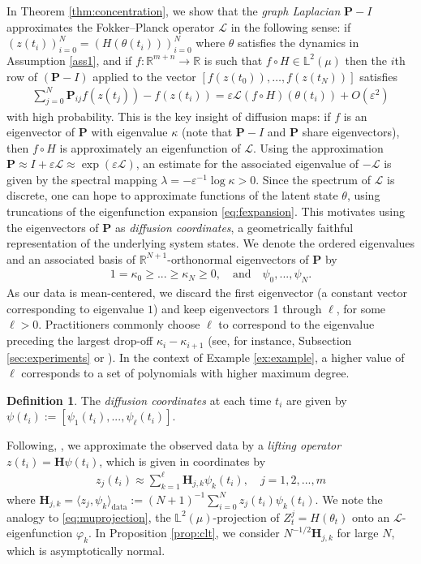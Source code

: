 \documentclass[11pt]{article}
\theoremstyle{plain}
\theoremstyle{definition}
\newtheorem{definition}[theorem]{Definition}
\theoremstyle{remark}
\numberwithin{equation}{section}
\newcommand{\R}{\mathbb{R}}
\renewcommand{\L}{\mathscr{L}}
\newcommand{\veps}{\varepsilon}
\newcommand{\bL}{\mathbb{L}}
\begin{document}
In Theorem \ref{thm:concentration}, we show that the \emph{graph Laplacian} $\mathbf{P}-I$ approximates the Fokker--Planck operator $\L$ in the following sense: if $(z(t_i))_{i=0}^{N}=(H(\theta(t_i)))_{i=0}^{N}$ where $\theta$ satisfies the dynamics in Assumption \ref{ass1}, and if $f:\R^{m+n}\to \R$ is such that $f\circ H\in \bL^2(\mu)$ then the $i$th row of $(\mathbf{P}-I)$ applied to the vector $[f(z(t_0)),\dots,f(z(t_N))]$ satisfies
\begin{align*}
\sum_{j=0}^N\mathbf{P}_{ij} f(z(t_j))-f(z(t_i))=\veps \L (f\circ H)(\theta(t_i))+O(\veps^2)
\end{align*}
with high probability. This is the key insight of diffusion maps: if $f$ is an eigenvector of $\mathbf{P}$ with eigenvalue $\kappa$ (note that $\mathbf{P}-I$ and $\mathbf{P}$ share eigenvectors), then $f\circ H$ is approximately an eigenfunction of $\L$. Using the approximation $\mathbf{P}\approx I+\veps \L\approx \exp(\veps \L)$, an estimate for the associated eigenvalue of $-\L$ is given by the spectral mapping $\lambda=-\veps^{-1}\log \kappa>0$. Since the spectrum of $\L$ is discrete, one can hope to approximate functions of the latent state $\theta$, using truncations of the eigenfunction expansion \eqref{eq:fexpansion}. This motivates using the eigenvectors of $\mathbf{P}$ as \emph{diffusion coordinates}, a geometrically faithful representation of the underlying system states.
We denote the ordered eigenvalues and an associated basis of $\R^{N+1}$-orthonormal eigenvectors of $\mathbf{P}$ by
\begin{align*}
1=\kappa_0\geq ... \geq \kappa_{N} \geq 0,\quad \text{and}\quad \psi_0,...,\psi_{N}.
\end{align*}
As our data is mean-centered, we discard the first eigenvector (a constant vector corresponding to eigenvalue $1$) and keep eigenvectors 1 through $\ell$, for some $\ell>0$. Practitioners commonly choose $\ell$ to correspond to the eigenvalue preceding the largest drop-off $\kappa_{i}-\kappa_{i+1}$ (see, for instance, Subsection \ref{sec:experiments} or \citet[Subsection 3.2]{coifman2008diffusion}). In the context of Example \ref{ex:example}, a higher value of $\ell$ corresponds to a set of polynomials with higher maximum degree.

\begin{definition}
The \emph{diffusion coordinates} at each time $t_i$ are given by $\psi(t_i):=[\psi_1(t_i), ..., \psi_\ell(t_i)]$.
\end{definition}

Following, \citet{shnitzer2020diffusion}, we approximate the observed data by a \emph{lifting operator} $z(t_i)=\mathbf{H} \psi(t_i)$, which is given in coordinates by 
\begin{align*}
z_j(t_i)\approx \sum_{k=1}^\ell \mathbf{H}_{j,k} \psi_k(t_i), \quad j=1,2,...,m
\end{align*}
where $\mathbf{H}_{j,k}=\langle z_j,\psi_k \rangle_{\text{data}}:=(N+1)^{-1}\sum_{i=0}^N z_j(t_i)\psi_k(t_i)$. We note the analogy to \eqref{eq:muprojection}, the $\bL^2(\mu)$-projection of $Z_t^j=H(\theta_t)$ onto an $\L$-eigenfunction $\varphi_k$. In Proposition \ref{prop:clt}, we consider $N^{-1/2}\mathbf{H}_{j,k}$ for large $N$, which is asymptotically normal.
\end{document}
